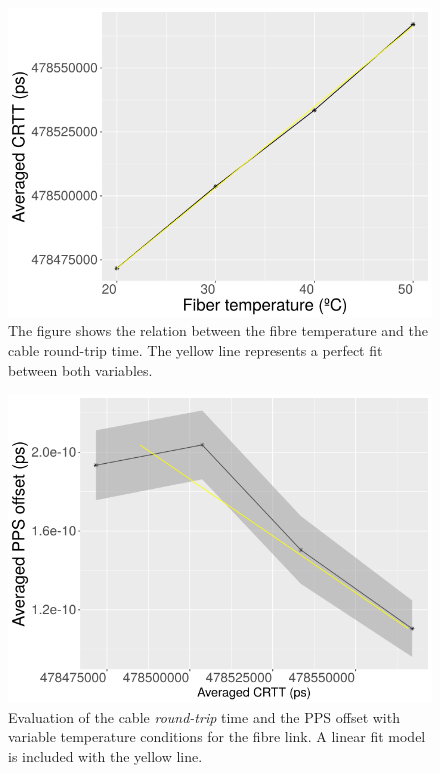 
\begin{figure}[t]
	\centering
	\includegraphics[width=0.7\linewidth]{img/crttvstemp}
	\caption[CRTT vs. Fibre temperature]{The figure shows the relation 
	between the fibre temperature and the cable round-trip time. The yellow 
	line represents a perfect fit between both variables.}
	\label{fig:crttvstemp}
\end{figure}

\begin{figure}[t]
	\centering
	\includegraphics[width=0.7\linewidth]{img/ppsvscrtt}
	\caption{Evaluation of the cable \textit{round-trip} time and the PPS 
	offset with variable temperature conditions for the fibre link. A linear 
	fit model is included with the yellow line.}
	\label{fig:ppsvscrtt}
\end{figure}

